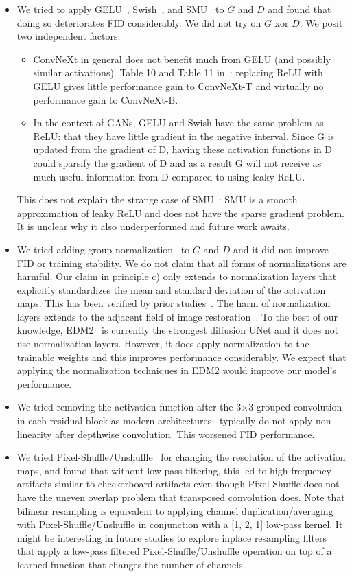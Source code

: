 \begin{itemize}
    \item We tried to apply GELU~\cite{gelu}, Swish~\cite{swish}, and SMU~\cite{smu} to $G$ and $D$ and found that doing so deteriorates FID considerably. We did not try on $G$ xor $D$. We posit two independent factors:
    \begin{itemize}
        \item ConvNeXt in general does not benefit much from GELU (and possibly similar activations). Table 10 and Table 11 in~\cite{convnext}: replacing ReLU with GELU gives little performance gain to ConvNeXt-T and virtually no performance gain to ConvNeXt-B.
        \item In the context of GANs, GELU and Swish have the same problem as ReLU: that they have little gradient in the negative interval. Since G is updated from the gradient of D, having these activation functions in D could sparsify the gradient of D and as a result G will not receive as much useful information from D compared to using leaky ReLU.
    \end{itemize}
    This does not explain the strange case of SMU~\cite{smu}: SMU is a smooth approximation of leaky ReLU and does not have the sparse gradient problem. It is unclear why it also underperformed and future work awaits.
    \item We tried adding group normalization~\cite{groupnorm} to $G$ and $D$ and it did not improve FID or training stability. We do not claim that all forms of normalizations are harmful. Our claim in principle c) only extends to normalization layers that explicitly standardizes the mean and standard deviation of the activation maps. This has been verified by prior studies~\cite{sg2,edm2,litevae}. The harm of normalization layers extends to the adjacent field of image restoration~\cite{edsr,esrgan}. To the best of our knowledge, EDM2~\cite{edm2} is currently the strongest diffusion UNet and it does not use normalization layers. However, it does apply normalization to the trainable weights and this improves performance considerably. We expect that applying the normalization techniques in EDM2 would improve our model's performance.
    \item We tried removing the activation function after the 3$\times$3 grouped convolution in each residual block as modern architectures~\cite{convnext,metaformer} typically do not apply non-linearity after depthwise convolution. This worsened FID performance.
    \item We tried Pixel-Shuffle/Unshuffle~\cite{pixshuffle} for changing the resolution of the activation maps, and found that without low-pass filtering, this led to high frequency artifacts similar to checkerboard artifacts even though Pixel-Shuffle does not have the uneven overlap problem that transposed convolution does. Note that bilinear resampling is equivalent to applying channel duplication/averaging with Pixel-Shuffle/Unshuffle in conjunction with a [1, 2, 1] low-pass kernel. It might be interesting in future studies to explore inplace resampling filters that apply a low-pass filtered Pixel-Shuffle/Unshuffle operation on top of a learned function that changes the number of channels.

\end{itemize}
